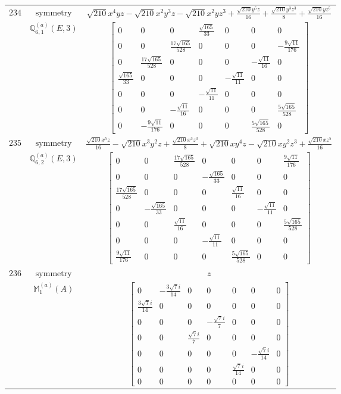 \documentclass[fleqn,8pt,landscape]{jsarticle}
\begin{document}
\begin{longtable}{ccc}
$ 234 $ & $ \text{symmetry} $ & $ \sqrt{210} x^{4} y z - \sqrt{210} x^{2} y^{3} z - \sqrt{210} x^{2} y z^{3} + \frac{\sqrt{210} y^{5} z}{16} + \frac{\sqrt{210} y^{3} z^{3}}{8} + \frac{\sqrt{210} y z^{5}}{16} $ \\
$  $ & $ \mathbb{Q}_{6,1}^{(a)}(E,3) $ & $ \begin{bmatrix} 0 & 0 & 0 & \frac{\sqrt{165}}{33} & 0 & 0 & 0 \\ 0 & 0 & \frac{17 \sqrt{165}}{528} & 0 & 0 & 0 & - \frac{9 \sqrt{11}}{176} \\ 0 & \frac{17 \sqrt{165}}{528} & 0 & 0 & 0 & - \frac{\sqrt{11}}{16} & 0 \\ \frac{\sqrt{165}}{33} & 0 & 0 & 0 & - \frac{\sqrt{11}}{11} & 0 & 0 \\ 0 & 0 & 0 & - \frac{\sqrt{11}}{11} & 0 & 0 & 0 \\ 0 & 0 & - \frac{\sqrt{11}}{16} & 0 & 0 & 0 & \frac{5 \sqrt{165}}{528} \\ 0 & - \frac{9 \sqrt{11}}{176} & 0 & 0 & 0 & \frac{5 \sqrt{165}}{528} & 0 \end{bmatrix} $ \\ \hline
$ 235 $ & $ \text{symmetry} $ & $ \frac{\sqrt{210} x^{5} z}{16} - \sqrt{210} x^{3} y^{2} z + \frac{\sqrt{210} x^{3} z^{3}}{8} + \sqrt{210} x y^{4} z - \sqrt{210} x y^{2} z^{3} + \frac{\sqrt{210} x z^{5}}{16} $ \\
$  $ & $ \mathbb{Q}_{6,2}^{(a)}(E,3) $ & $ \begin{bmatrix} 0 & 0 & \frac{17 \sqrt{165}}{528} & 0 & 0 & 0 & \frac{9 \sqrt{11}}{176} \\ 0 & 0 & 0 & - \frac{\sqrt{165}}{33} & 0 & 0 & 0 \\ \frac{17 \sqrt{165}}{528} & 0 & 0 & 0 & \frac{\sqrt{11}}{16} & 0 & 0 \\ 0 & - \frac{\sqrt{165}}{33} & 0 & 0 & 0 & - \frac{\sqrt{11}}{11} & 0 \\ 0 & 0 & \frac{\sqrt{11}}{16} & 0 & 0 & 0 & \frac{5 \sqrt{165}}{528} \\ 0 & 0 & 0 & - \frac{\sqrt{11}}{11} & 0 & 0 & 0 \\ \frac{9 \sqrt{11}}{176} & 0 & 0 & 0 & \frac{5 \sqrt{165}}{528} & 0 & 0 \end{bmatrix} $ \\ \hline
$ 236 $ & $ \text{symmetry} $ & $ z $ \\
$  $ & $ \mathbb{M}_{1}^{(a)}(A) $ & $ \begin{bmatrix} 0 & - \frac{3 \sqrt{7} i}{14} & 0 & 0 & 0 & 0 & 0 \\ \frac{3 \sqrt{7} i}{14} & 0 & 0 & 0 & 0 & 0 & 0 \\ 0 & 0 & 0 & - \frac{\sqrt{7} i}{7} & 0 & 0 & 0 \\ 0 & 0 & \frac{\sqrt{7} i}{7} & 0 & 0 & 0 & 0 \\ 0 & 0 & 0 & 0 & 0 & - \frac{\sqrt{7} i}{14} & 0 \\ 0 & 0 & 0 & 0 & \frac{\sqrt{7} i}{14} & 0 & 0 \\ 0 & 0 & 0 & 0 & 0 & 0 & 0 \end{bmatrix} $ \\ \hline

\end{longtable}
\end{document}
